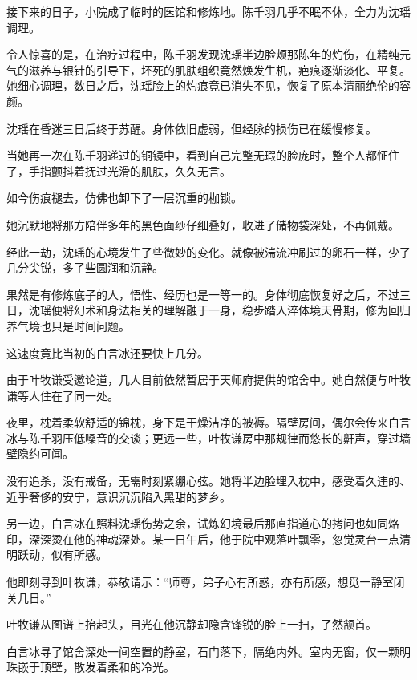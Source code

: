 \vspace{2em}

接下来的日子，小院成了临时的医馆和修炼地。陈千羽几乎不眠不休，全力为沈瑶调理。

令人惊喜的是，在治疗过程中，陈千羽发现沈瑶半边脸颊那陈年的灼伤，在精纯元气的滋养与银针的引导下，坏死的肌肤组织竟然焕发生机，疤痕逐渐淡化、平复。她细心调理，数日之后，沈瑶脸上的灼痕竟已消失不见，恢复了原本清丽绝伦的容颜。

沈瑶在昏迷三日后终于苏醒。身体依旧虚弱，但经脉的损伤已在缓慢修复。

当她再一次在陈千羽递过的铜镜中，看到自己完整无瑕的脸庞时，整个人都怔住了，手指颤抖着抚过光滑的肌肤，久久无言。

如今伤痕褪去，仿佛也卸下了一层沉重的枷锁。

她沉默地将那方陪伴多年的黑色面纱仔细叠好，收进了储物袋深处，不再佩戴。

\vspace{2em}

经此一劫，沈瑶的心境发生了些微妙的变化。就像被湍流冲刷过的卵石一样，少了几分尖锐，多了些圆润和沉静。

果然是有修炼底子的人，悟性、经历也是一等一的。身体彻底恢复好之后，不过三日，沈瑶便将幻术和身法相关的理解融于一身，稳步踏入淬体境天骨期，修为回归养气境也只是时间问题。

这速度竟比当初的白言冰还要快上几分。

由于叶牧谦受邀论道，几人目前依然暂居于天师府提供的馆舍中。她自然便与叶牧谦等人住在了同一处。

夜里，枕着柔软舒适的锦枕，身下是干燥洁净的被褥。隔壁房间，偶尔会传来白言冰与陈千羽压低嗓音的交谈；更远一些，叶牧谦房中那规律而悠长的鼾声，穿过墙壁隐约可闻。

没有追杀，没有戒备，无需时刻紧绷心弦。她将半边脸埋入枕中，感受着久违的、近乎奢侈的安宁，意识沉沉陷入黑甜的梦乡。

\vspace{2em}

另一边，白言冰在照料沈瑶伤势之余，试炼幻境最后那直指道心的拷问也如同烙印，深深烫在他的神魂深处。某一日午后，他于院中观落叶飘零，忽觉灵台一点清明跃动，似有所感。

他即刻寻到叶牧谦，恭敬请示：“师尊，弟子心有所惑，亦有所感，想觅一静室闭关几日。”

叶牧谦从图谱上抬起头，目光在他沉静却隐含锋锐的脸上一扫，了然颔首。

白言冰寻了馆舍深处一间空置的静室，石门落下，隔绝内外。室内无窗，仅一颗明珠嵌于顶壁，散发着柔和的冷光。


